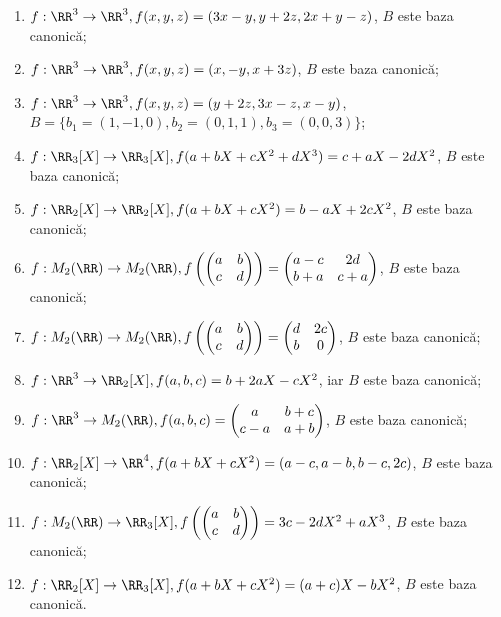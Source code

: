 \begin{enumerate}[(1)]
    \item $ f : \RR^3 \to \RR^3, f(x, y, z) = (3x - y, y + 2z, 2x + y - z) $,
        $ B $ este baza canonică;
    \item $ f : \RR^3 \to \RR^3, f(x, y, z) = (x, -y, x + 3z) $, $ B $ este
        baza canonică;
    \item $ f : \RR^3 \to \RR^3, f(x, y, z) = (y + 2z, 3x - z, x - y) $,
        $ B = \{ b_1 = (1, -1, 0), b_2 = (0, 1, 1), b_3 = (0, 0, 3) \} $;
    \item $ f : \RR_3[X] \to \RR_3[X], f(a + bX + cX^2 + dX^3) = c + aX - 2dX^2 $,
        $ B $ este baza canonică;
    \item $ f : \RR_2[X] \to \RR_2[X], f(a + bX + cX^2) = b - aX + 2cX^2 $,
        $ B $ este baza canonică;
    \item $ f : M_2(\RR) \to M_2(\RR), f \left( \begin{pmatrix} a & b \\ c & d \end{pmatrix} \right) = %
        \begin{pmatrix} a - c & 2d \\ b + a & c + a \end{pmatrix} $, $ B $ este baza canonică;
    \item $ f : M_2(\RR) \to M_2(\RR), f \left( \begin{pmatrix} a & b \\ c & d \end{pmatrix} \right) = %
        \begin{pmatrix} d & 2c \\ b & 0 \end{pmatrix} $, $ B $ este baza canonică;
    \item $ f : \RR^3 \to \RR_2[X], f(a, b, c) = b + 2aX - cX^2 $, iar $ B $ este baza canonică;
    \item $ f : \RR^3 \to M_2(\RR), f(a, b, c) = \begin{pmatrix} a & b + c \\ c - a & a + b \end{pmatrix} $,
        $ B $ este baza canonică;
    \item $ f : \RR_2[X] \to \RR^4, f(a + bX + cX^2) = (a - c, a - b, b - c, 2c) $, $ B $ este baza
        canonică;
    \item $ f : M_2(\RR) \to \RR_3[X], f\left( \begin{pmatrix} a & b \\ c & d \end{pmatrix} \right) = %
        3c - 2dX^2 + aX^3 $, $ B $ este baza canonică;
    \item $ f : \RR_2[X] \to \RR_3[X], f(a + bX + cX^2) = (a + c)X - bX^2 $, $ B $ este baza canonică.
\end{enumerate}

